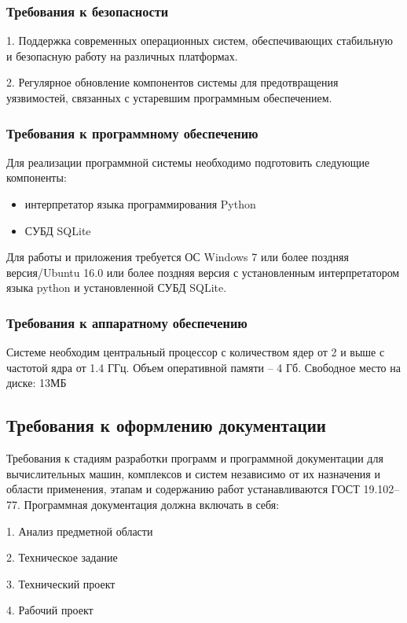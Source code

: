 \subsubsection{Требования к безопасности}
1. Поддержка современных операционных систем, обеспечивающих стабильную и безопасную работу на различных платформах.

2. Регулярное обновление компонентов системы для предотвращения уязвимостей, связанных с устаревшим программным обеспечением.

\subsubsection{Требования к программному обеспечению}

Для реализации программной системы необходимо подготовить следующие компоненты:
\begin{itemize}
	\item интерпретатор языка программирования Python
	\item СУБД SQLite
\end{itemize}
Для работы и приложения требуется ОС Windows 7 или более поздняя версия/Ubuntu 16.0 или более поздняя версия с установленным интерпретатором языка python и установленной СУБД SQLite.

\subsubsection{Требования к аппаратному обеспечению}
Системе необходим центральный процессор с количеством ядер от 2 и выше с частотой ядра от 1.4 ГГц. Объем оперативной памяти – 4 Гб.
Свободное место на диске: 13МБ

\subsection{Требования к оформлению документации}

Требования к стадиям разработки программ и программной документации для вычислительных машин, комплексов и систем независимо от их
назначения и области применения, этапам и содержанию работ устанавливаются ГОСТ 19.102–77. Программная документация должна включать в себя:

1. Анализ предметной области

2. Техническое задание

3. Технический проект

4. Рабочий проект

